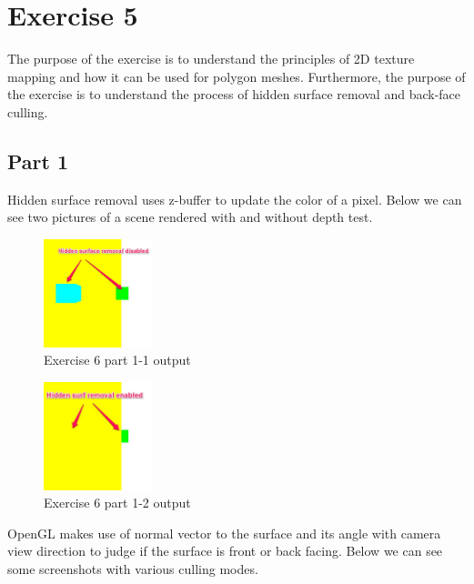 \chapter{Exercise 5}
The purpose of the exercise is to understand the principles of 2D
texture mapping and how it can be used for polygon meshes.
Furthermore, the purpose of the exercise is to understand the
process of hidden surface removal and back-face culling.

\section{Part 1}
Hidden surface removal uses z-buffer to update the color of a pixel. Below
we can see two pictures of a scene rendered with and without depth test.

\begin{figure}[ht!]
	\begin{center}
		\includegraphics[width=0.28\textwidth]{figures/exercise_6_part_1_1}
	\end{center}
	\vspace{-4.5ex}\caption{Exercise 6 part 1-1 output}
	\label{fig:exercise_6_part_1_1} 
\end{figure}
\begin{figure}[ht!]
	\begin{center}
		\includegraphics[width=0.28\textwidth]{figures/exercise_6_part_1_2}
	\end{center}
	\vspace{-4.5ex}\caption{Exercise 6 part 1-2 output}
	\label{fig:exercise_6_part_1_2} 
\end{figure}

OpenGL makes use of normal vector to the surface and its angle with camera view direction
to judge if the surface is front or back facing. Below we can see some screenshots
with various culling modes.

